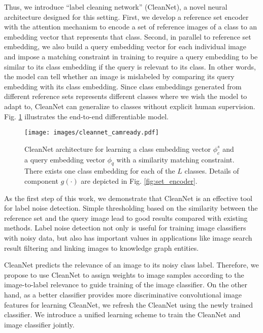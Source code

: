 \documentclass[10pt,twocolumn,letterpaper]{article}
\begin{document}
Thus, we introduce ``label cleaning network'' (CleanNet), a novel neural architecture designed for this setting. First, we develop a reference set encoder with the attention mechanism to encode a set of reference images of a class to an embedding vector that represents that class. Second, in parallel to reference set embedding, we also build a query embedding vector for each individual image and impose a matching constraint in training to require a query embedding to be similar to its class embedding if the query is relevant to its class. In other words, the model can tell whether an image is mislabeled by comparing its query embedding with its class embedding. Since class embeddings generated from different reference sets represents different classes where we wish the model to adapt to, CleanNet can generalize to classes without explicit human supervision. Fig. \ref{fig:cleansenet} illustrates the end-to-end differentiable model. 

\begin{figure}[t]
\begin{center}
\texttt{[image: images/cleannet\_camready.pdf]}
\end{center}
\vspace{-3mm}
\caption{CleanNet architecture for learning a class embedding vector $\phi_c^s$ and a query embedding vector $\phi_q$ with a similarity matching constraint. There exists one class embedding for each of the $L$ classes. Details of component $g(\cdot)$ are depicted in Fig. \ref{fig:set_encoder}.}
\label{fig:cleansenet}
\end{figure} 

As the first step of this work, we demonstrate that CleanNet is an effective tool for label noise detection. Simple thresholding based on the similarity between the reference set and the query image lead to good results compared with existing methods. Label noise detection not only is useful for training image classifiers with noisy data, but also has important values in applications like image search result filtering and linking images to knowledge graph entities.

CleanNet predicts the relevance of an image to its noisy class label. Therefore, we propose to use CleanNet to assign weights to image samples according to the image-to-label relevance to guide training of the image classifier. On the other hand, as a better classifier provides more discriminative convolutional image features for learning CleanNet, we refresh the CleanNet using the newly trained classifier. We introduce a unified learning scheme to train the CleanNet and image classifier jointly.
\end{document}
